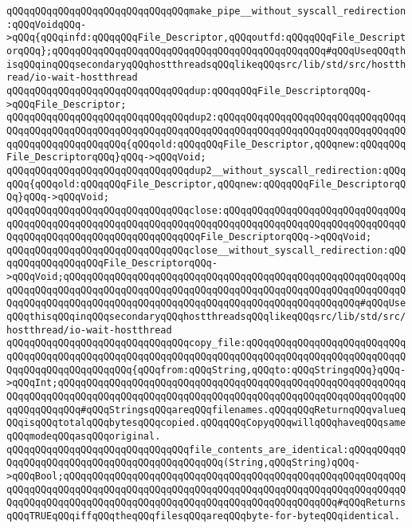 \verb|qQQqqQQqqQQqqQQqqQQqqQQqqQQqqQQqmake_pipe__without_syscall_redirection:qQQqVoidqQQq->qQQq{qQQqinfd:qQQqqQQqFile_Descriptor,qQQqoutfd:qQQqqQQqFile_DescriptorqQQq};qQQqqQQqqQQqqQQqqQQqqQQqqQQqqQQqqQQqqQQqqQQqqQQq#qQQqUseqQQqthisqQQqinqQQqsecondaryqQQqhostthreadsqQQqlikeqQQqsrc/lib/std/src/hostthread/io-wait-hostthread|\newline
\newline
\verb|qQQqqQQqqQQqqQQqqQQqqQQqqQQqqQQqdup:qQQqqQQqFile_DescriptorqQQq->qQQqFile_Descriptor;|\newline
\newline
\verb|qQQqqQQqqQQqqQQqqQQqqQQqqQQqqQQqdup2:qQQqqQQqqQQqqQQqqQQqqQQqqQQqqQQqqQQqqQQqqQQqqQQqqQQqqQQqqQQqqQQqqQQqqQQqqQQqqQQqqQQqqQQqqQQqqQQqqQQqqQQqqQQqqQQqqQQqqQQqqQQq{qQQqold:qQQqqQQqFile_Descriptor,qQQqnew:qQQqqQQqFile_DescriptorqQQq}qQQq->qQQqVoid;|\newline
\verb|qQQqqQQqqQQqqQQqqQQqqQQqqQQqqQQqdup2__without_syscall_redirection:qQQqqQQq{qQQqold:qQQqqQQqFile_Descriptor,qQQqnew:qQQqqQQqFile_DescriptorqQQq}qQQq->qQQqVoid;|\newline
\newline
\verb|qQQqqQQqqQQqqQQqqQQqqQQqqQQqqQQqclose:qQQqqQQqqQQqqQQqqQQqqQQqqQQqqQQqqQQqqQQqqQQqqQQqqQQqqQQqqQQqqQQqqQQqqQQqqQQqqQQqqQQqqQQqqQQqqQQqqQQqqQQqqQQqqQQqqQQqqQQqqQQqqQQqqQQqqQQqFile_DescriptorqQQq->qQQqVoid;|\newline
\verb|qQQqqQQqqQQqqQQqqQQqqQQqqQQqqQQqclose__without_syscall_redirection:qQQqqQQqqQQqqQQqqQQqFile_DescriptorqQQq->qQQqVoid;qQQqqQQqqQQqqQQqqQQqqQQqqQQqqQQqqQQqqQQqqQQqqQQqqQQqqQQqqQQqqQQqqQQqqQQqqQQqqQQqqQQqqQQqqQQqqQQqqQQqqQQqqQQqqQQqqQQqqQQqqQQqqQQqqQQqqQQqqQQqqQQqqQQqqQQqqQQqqQQqqQQqqQQqqQQqqQQqqQQqqQQqqQQqqQQq#qQQqUseqQQqthisqQQqinqQQqsecondaryqQQqhostthreadsqQQqlikeqQQqsrc/lib/std/src/hostthread/io-wait-hostthread|\newline
\newline
\verb|qQQqqQQqqQQqqQQqqQQqqQQqqQQqqQQqcopy_file:qQQqqQQqqQQqqQQqqQQqqQQqqQQqqQQqqQQqqQQqqQQqqQQqqQQqqQQqqQQqqQQqqQQqqQQqqQQqqQQqqQQqqQQqqQQqqQQqqQQqqQQqqQQqqQQqqQQqqQQq{qQQqfrom:qQQqString,qQQqto:qQQqStringqQQq}qQQq->qQQqInt;qQQqqQQqqQQqqQQqqQQqqQQqqQQqqQQqqQQqqQQqqQQqqQQqqQQqqQQqqQQqqQQqqQQqqQQqqQQqqQQqqQQqqQQqqQQqqQQqqQQqqQQqqQQqqQQqqQQqqQQqqQQqqQQqqQQqqQQqqQQqqQQq#qQQqStringsqQQqareqQQqfilenames.qQQqqQQqReturnqQQqvalueqQQqisqQQqtotalqQQqbytesqQQqcopied.qQQqqQQqCopyqQQqwillqQQqhaveqQQqsameqQQqmodeqQQqasqQQqoriginal.|\newline
\newline
\verb|qQQqqQQqqQQqqQQqqQQqqQQqqQQqqQQqfile_contents_are_identical:qQQqqQQqqQQqqQQqqQQqqQQqqQQqqQQqqQQqqQQqqQQqqQQq(String,qQQqString)qQQq->qQQqBool;qQQqqQQqqQQqqQQqqQQqqQQqqQQqqQQqqQQqqQQqqQQqqQQqqQQqqQQqqQQqqQQqqQQqqQQqqQQqqQQqqQQqqQQqqQQqqQQqqQQqqQQqqQQqqQQqqQQqqQQqqQQqqQQqqQQqqQQqqQQqqQQqqQQqqQQqqQQqqQQqqQQqqQQqqQQqqQQqqQQqqQQqqQQq#qQQqReturnsqQQqTRUEqQQqiffqQQqtheqQQqfilesqQQqareqQQqbyte-for-byteqQQqidentical.|\newline
